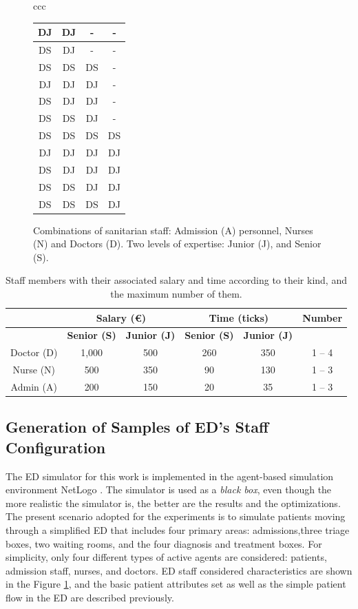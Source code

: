 \documentclass[11pt]{article} %
\begin{document}
\begin{figure}[htb!]
\begin{tabular}{ccc}
{{\begin{tabular}{cccc}
DJ  & DJ  & -  & -  \\ \hline
DS  & DJ  & -  & -  \\ \hline
DS  & DS  & DS  & -  \\ \hline
DJ  & DJ  & DJ  & -  \\ \hline
DS  & DJ  & DJ  & -  \\ \hline
DS  & DS  & DJ  & -  \\ \hline
DS  & DS  & DS  & DS  \\ \hline
DJ  & DJ  & DJ  & DJ  \\ \hline
DS  & DJ  & DJ  & DJ  \\ \hline
DS  & DS  & DJ  & DJ  \\ \hline
DS  & DS  & DS  & DJ  \\ \hline
\end{tabular}
}
        }
\end{tabular}
\caption{Combinations of sanitarian staff: Admission (A) personnel, Nurses (N) and Doctors (D). Two levels of expertise: Junior (J), and Senior (S).}
\label{fig:combs}
\end{figure}

\begin{table}[htb!]
\centering
\caption{Staff members with their associated salary and time according to their kind, and the maximum number of them.}
\resizebox{3.2in}{!} {
\begin{tabular}{cccccc}
\hline
\textbf{} & \multicolumn{ 2}{c}{\bf {Salary (\euro)}} & \multicolumn{ 2}{c}{\bf {Time (ticks)}} & \bf {Number}  \\ \hline
 & \bf {Senior (S)}  & \bf {Junior (J)}  & \bf {Senior (S)}  & \bf {Junior (J)}  &  \\ \hline
Doctor (D)  & 1,000 & 500 & 260 & 350 & 1 -- 4  \\ \hline
Nurse (N)  & 500 & 350 & 90 & 130 & 1 -- 3  \\ \hline
Admin (A) & 200 & 150 & 20 & 35 & 1 -- 3  \\ \hline
\end{tabular}
}
\label{tab:T1}
\end{table}

\subsection {Generation of Samples of ED's Staff Configuration}
\label{sec:simu}

The ED simulator for this work is implemented in the agent-based simulation environment NetLogo \cite{netlogo}. The simulator is used as a \emph{black box}, even though the more realistic the simulator is, the better are the results and the optimizations. 
The present scenario adopted for the experiments is to simulate patients moving through a simplified ED that includes four primary areas: admissions,three triage boxes, two waiting rooms, and the four diagnosis and treatment boxes. For simplicity, only four different types of active agents are considered: patients, admission staff, nurses, and doctors. ED staff considered characteristics are shown in  the Figure \ref{fig:combs}, and the basic patient attributes set as well as the simple patient flow in the ED are described previously. 
\end{document}
